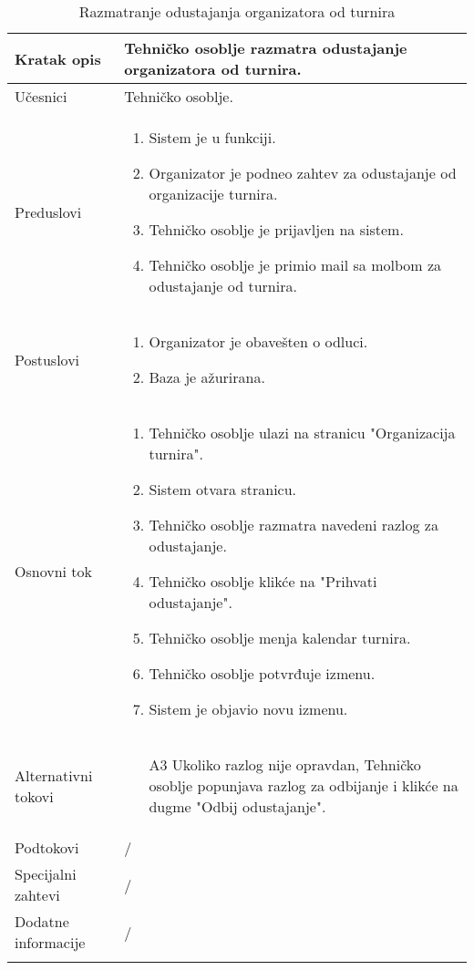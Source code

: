 \documentclass{article}
\begin{document}
 \begin{longtable}{| p{} | p{} |} 
            \hline
                Kratak opis & Tehničko osoblje razmatra odustajanje organizatora od turnira. \\ 
            \hline    
                Učesnici & Tehničko osoblje.\\
            \hline
               Preduslovi & \begin{enumerate}
                   \item Sistem je u funkciji.
                   \item Organizator je podneo zahtev za odustajanje od organizacije turnira.
                   \item Tehničko osoblje je prijavljen na sistem. 
                   \item Tehničko osoblje je primio mail sa molbom za odustajanje od turnira.
                \end{enumerate}\\
            \hline  
                Postuslovi & \begin{enumerate}
                   \item Organizator je obavešten o odluci.
                   \item Baza je ažurirana. 
                \end{enumerate}\\
            \hline
                Osnovni tok & \begin{enumerate}
                    \item Tehničko osoblje ulazi na stranicu "Organizacija turnira".
                    \item Sistem otvara stranicu.
                    \item Tehničko osoblje razmatra navedeni razlog za odustajanje.
                    \item Tehničko osoblje klikće na "Prihvati odustajanje".
                    \item Tehničko osoblje menja kalendar turnira.
                    \item Tehničko osoblje potvrđuje izmenu.
                    \item Sistem je objavio novu izmenu.
                \end{enumerate}\\
            \hline
                Alternativni tokovi & 
                \begin{itemize}
                    \item[A3] Ukoliko razlog nije opravdan, Tehničko osoblje popunjava razlog za odbijanje i klikće na dugme "Odbij odustajanje".
                \end{itemize}\\
            \hline
                Podtokovi & /\\
            \hline
                Specijalni zahtevi & /\\
            \hline
                Dodatne informacije & /\\
            \hline
            \caption{Razmatranje odustajanja organizatora od turnira}
        \end{longtable}
\end{document}
